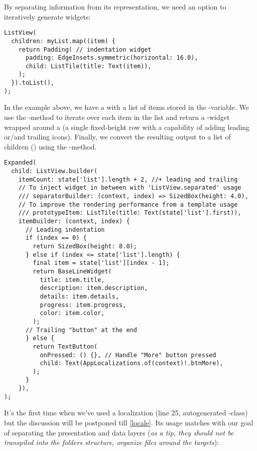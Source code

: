 \noindent By separating information from its representation, we need an option to iteratively generate widgets:

\begin{lstlisting}
ListView(
  children: myList.map((item) {
    return Padding( // indentation widget
      padding: EdgeInsets.symmetric(horizontal: 16.0),
      child: ListTile(title: Text(item)),
    );
  }).toList(),
);
\end{lstlisting}

\noindent In the example above, we have a  with a list of items stored in the -variable. We use 
the -method to iterate over each item in the list and return a -widget wrapped around a 
 (a single fixed-height row with a capability of adding leading or/and trailing icons). Finally, we convert 
the resulting output  to a list of children () using the -method. 

\begin{lstlisting}
Expanded(
  child: ListView.builder(
    itemCount: state['list'].length + 2, //+ leading and trailing
    // To inject widget in between with 'ListView.separated' usage
    /// separatorBuilder: (context, index) => SizedBox(height: 4.0),
    // To improve the rendering performance from a template usage
    /// prototypeItem: ListTile(title: Text(state['list'].first)),
    itemBuilder: (context, index) {
      // Leading indentation
      if (index == 0) { 
        return SizedBox(height: 8.0);
      } else if (index <= state['list'].length) {
        final item = state['list'][index - 1];
        return BaseLineWidget(
          title: item.title,
          description: item.description,
          details: item.details,
          progress: item.progress,
          color: item.color,
        );
      // Trailing "button" at the end
      } else { 
        return TextButton(
          onPressed: () {}, // Handle "More" button pressed
          child: Text(AppLocalizations.of(context)!.btnMore),
        );
      }
    }),
);
\end{lstlisting}

\noindent It's the first time when we've used a localization (line 25, autogenerated -class) but the 
discussion will be postponed till \cref{locale}. Its usage matches with our goal of separating the presentation and data 
layers (\emph{as a tip, they should not be transpiled into the folders structure, organize files around the targets}):

